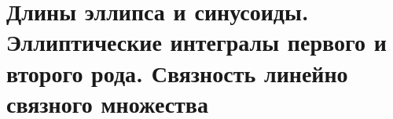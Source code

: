 \section{Длины эллипса и синусоиды. Эллиптические интегралы первого и второго рода. Связность линейно связного множества}
